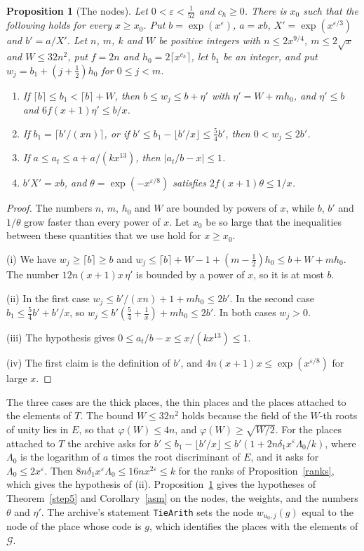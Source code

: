 \documentclass[11pt,letterpaper]{article}
\newtheorem{proposition}[theorem]{Proposition}
\numberwithin{equation}{section}
\begin{document}
\begin{proposition}[The nodes]\label{nodes}
Let $0<\varepsilon<\tfrac1{52}$ and $c_h\ge0$. There is $x_0$ such that the following holds for every $x\ge x_0$. Put $b=\exp(x^{\varepsilon})$, $a=xb$, $X'=\exp(x^{\varepsilon/3})$ and $b'=a/X'$. Let $n$, $m$, $k$ and $W$ be positive integers with $n\le2x^{9/4}$, $m\le2\sqrt x$ and $W\le32n^2$, put $f=2n$ and $h_0=2\lceil x^{c_h}\rceil$, let $b_1$ be an integer, and put $w_j=b_1+(j+\tfrac12)h_0$ for $0\le j<m$.
\begin{enumerate}
\item[(i)] If $\lceil b\rceil\le b_1<\lceil b\rceil+W$, then $b\le w_j\le b+\eta'$ with $\eta'=W+mh_0$, and $\eta'\le b$ and $6f(x+1)\eta'\le b/x$.
\item[(ii)] If $b_1=\lceil b'/(xn)\rceil$, or if $b'\le b_1-\lfloor b'/x\rfloor\le\tfrac54b'$, then $0<w_j\le2b'$.
\item[(iii)] If $a\le a_t\le a+a/(kx^{13})$, then $|a_t/b-x|\le1$.
\item[(iv)] $b'X'=xb$, and $\theta=\exp(-x^{\varepsilon/8})$ satisfies $2f(x+1)\theta\le1/x$.
\end{enumerate}
\end{proposition}
\begin{proof}
The numbers $n$, $m$, $h_0$ and $W$ are bounded by powers of $x$, while $b$, $b'$ and $1/\theta$ grow faster than every power of $x$. Let $x_0$ be so large that the inequalities between these quantities that we use hold for $x\ge x_0$.

(i) We have $w_j\ge\lceil b\rceil\ge b$ and $w_j\le\lceil b\rceil+W-1+(m-\tfrac12)h_0\le b+W+mh_0$. The number $12n(x+1)x\,\eta'$ is bounded by a power of $x$, so it is at most $b$.

(ii) In the first case $w_j\le b'/(xn)+1+mh_0\le2b'$. In the second case $b_1\le\tfrac54b'+b'/x$, so $w_j\le b'(\tfrac54+\tfrac1x)+mh_0\le2b'$. In both cases $w_j>0$.

(iii) The hypothesis gives $0\le a_t/b-x\le x/(kx^{13})\le1$.

(iv) The first claim is the definition of $b'$, and $4n(x+1)x\le\exp(x^{\varepsilon/8})$ for large $x$.
\end{proof}

The three cases are the thick places, the thin places and the places attached to the elements of $T$. The bound $W\le32n^2$ holds because the field of the $W$-th roots of unity lies in $E$, so that $\varphi(W)\le4n$, and $\varphi(W)\ge\sqrt{W/2}$. For the places attached to $T$ the archive asks for $b'\le b_1-\lfloor b'/x\rfloor\le b'(1+2n\delta_1x^{\varepsilon}\Lambda_0/k)$, where $\Lambda_0$ is the logarithm of $a$ times the root discriminant of $E$, and it asks for $\Lambda_0\le2x^{\varepsilon}$. Then $8n\delta_1x^{\varepsilon}\Lambda_0\le16nx^{2\varepsilon}\le k$ for the ranks of Proposition~\ref{ranks}, which gives the hypothesis of (ii). Proposition~\ref{nodes} gives the hypotheses of Theorem~\ref{step5} and Corollary~\ref{asm} on the nodes, the weights, and the numbers $\theta$ and $\eta'$. The archive's statement \texttt{TieArith} sets the node $w_{u_0,j}(g)$ equal to the node of the place whose code is $g$, which identifies the places with the elements of $\mathcal G$.
\end{document}
